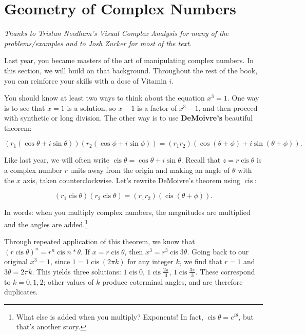 \documentclass[../gatm.tex]{subfiles}
\begin{document}

\section{Geometry of Complex Numbers}

\newcommand{\Arg} {\operatorname{Arg}}
\newcommand{\cis} {\operatorname{cis}}
\newcommand{\Real} {\operatorname{Re}}
\newcommand{\Imag} {\operatorname{Im}}

\textit{Thanks to Tristan Needham's \emph{Visual Complex Analysis} for many of the problems/examples and to Josh Zucker for most of the text.}

Last year, you became masters of the art of manipulating complex numbers. In this section, we will build on that background. Throughout the rest of the book, you can reinforce your skills with a dose of Vitamin $i$.

You should know at least two ways to think about the equation $x^3 = 1$. One way is to see that $x = 1$ is a solution, so $x - 1$ is a factor of $x^3-1$, and then proceed with synthetic or long division. The other way is to use \textbf{DeMoivre’s} beautiful theorem:

$$(r_1 (\cos \theta + i \sin \theta)) (r_2 (\cos \phi + i \sin \phi)) = (r_1r_2) (\cos(\theta + \phi) + i \sin(\theta + \phi)).$$

Like last year, we will often write $\cis \theta = \cos \theta + i \sin \theta$. Recall that $z=r\cis \theta$ is a complex number $r$ units away from the origin and making an angle of $\theta$ with the $x$ axis, taken counterclockwise. Let’s rewrite DeMoivre’s theorem using $\cis$:

$$(r_1 \cis \theta)(r_2 \cis \theta) = (r_1r_2)(\cis(\theta + \phi)).$$

In words: when you multiply complex numbers, the magnitudes are multiplied and the angles are added.\footnote{What else is added when you multiply? Exponents! In fact, $\cis \theta = e^{i\theta}$, but that’s another story.}

Through repeated application of this theorem, we know that $(r \cis \theta) ^ n = r^n \cis n*\theta$. If $x = r \cis \theta$, then $x^3 = r^3 \cis 3\theta$. Going back to our original $x^3 = 1$, since $1 = 1 \cis(2\pi k)$ for any integer $k$, we find that $r = 1$ and $3\theta = 2\pi k$. This yields three solutions: $1 \cis 0$, $1 \cis \frac{2\pi}{3}$, $1 \cis \frac{3\pi}{3}$. These correspond to $k = 0, 1, 2$; other values of $k$ produce coterminal angles, and are therefore duplicates.
\end{document}
